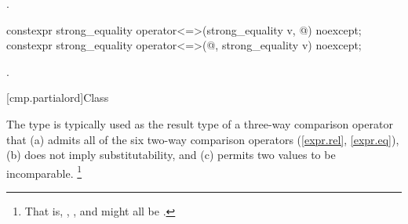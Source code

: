 \begin{itemdescr}
\pnum
\returns
{}.
\end{itemdescr}

%
\begin{itemdecl}
constexpr strong_equality operator<=>(strong_equality v, @\unspec@) noexcept;
constexpr strong_equality operator<=>(@\unspec@, strong_equality v) noexcept;
\end{itemdecl}

\begin{itemdescr}
\pnum
\returns
{}.
\end{itemdescr}

[cmp.partialord]{Class }

\pnum
The  type is typically used
as the result type of a three-way comparison operator
that (a) admits all of the six two-way comparison operators (\ref{expr.rel}, \ref{expr.eq}),
(b) does not imply substitutability,
and (c) permits two values to be incomparable.%
\footnote{That is, , , and  might all be .}

